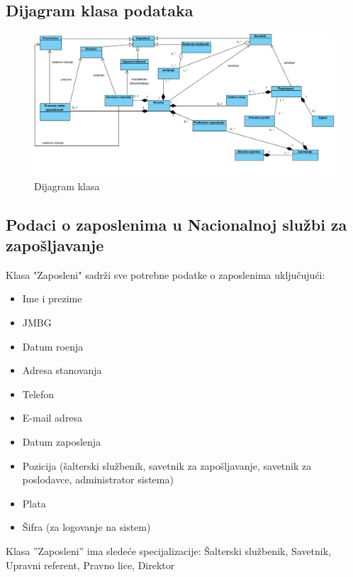 \begin{mylandscape}
\subsection{Dijagram klasa podataka}

\begin{figure}[H]
	\centering
	\includegraphics[width=0.8\paperwidth]{dijagrami/dijagrami-klasa/dijagrami-klasa.png}
	\caption{Dijagram klasa}
	\label{dk}
\end{figure}
\end{mylandscape}


\subsection{Podaci o zaposlenima u Nacionalnoj slu\v zbi za zapo\v sljavanje}

Klasa "Zaposleni" sadr\v zi sve potrebne podatke o zaposlenima uklju\v cuju\' ci:
\begin{itemize}
	\item Ime i prezime
	\item JMBG
	\item Datum ro\dj enja
	\item Adresa stanovanja
	\item Telefon
	\item E-mail adresa
	\item Datum zaposlenja
	\item Pozicija (\v salterski slu\v zbenik, savetnik za zapo\v sljavanje, savetnik za poslodavce, administrator sistema)
	\item Plata
	\item \v Sifra (za logovanje na sistem)
\end{itemize}

\noindent Klasa ''Zaposleni'' ima slede\' ce specijalizacije: \v Salterski slu\v zbenik, Savetnik, Upravni referent, Pravno lice, Direktor

